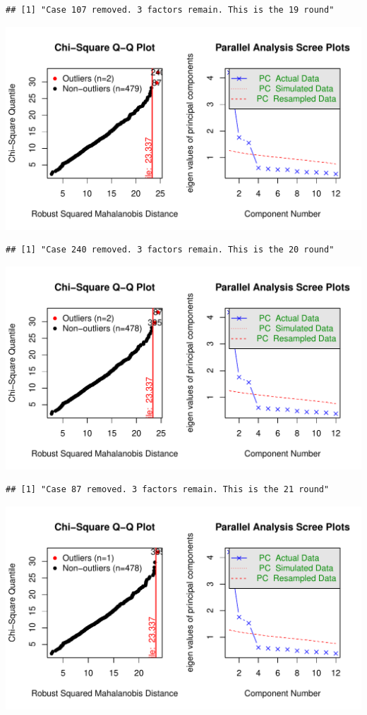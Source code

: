 \documentclass{article}\usepackage[]{graphicx}\usepackage[]{color}
\makeatletter
\def\maxwidth{ %
  \ifdim\Gin@nat@width>\linewidth
    \linewidth
  \else
    \Gin@nat@width
  \fi
}
\newenvironment{kframe}{%
 \def\at@end@of@kframe{}%
 \ifinner\ifhmode%
  \def\at@end@of@kframe{\end{minipage}}%
  \begin{minipage}{\columnwidth}%
 \fi\fi%
 \def\FrameCommand##1{\hskip\@totalleftmargin \hskip-\fboxsep
 \colorbox{shadecolor}{##1}\hskip-\fboxsep
     \hskip-\linewidth \hskip-\@totalleftmargin \hskip\columnwidth}%
 \MakeFramed {\advance\hsize-\width
   \@totalleftmargin\z@ \linewidth\hsize
   \@setminipage}}%
 {\par\unskip\endMakeFramed%
 \at@end@of@kframe}
\newenvironment{knitrout}{}{} %
\makeatother
\begin{document}
\begin{knitrout}
\begin{kframe}\begin{verbatim}
## [1] "Case 107 removed. 3 factors remain. This is the 19 round"
\end{verbatim}
\end{kframe}
\includegraphics[width=\maxwidth]{figure/unnamed-chunk-10-20} 
\begin{kframe}\begin{verbatim}
## [1] "Case 240 removed. 3 factors remain. This is the 20 round"
\end{verbatim}
\end{kframe}
\includegraphics[width=\maxwidth]{figure/unnamed-chunk-10-21} 
\begin{kframe}\begin{verbatim}
## [1] "Case 87 removed. 3 factors remain. This is the 21 round"
\end{verbatim}
\end{kframe}
\includegraphics[width=\maxwidth]{figure/unnamed-chunk-10-22} 

\end{knitrout}
\end{document}
